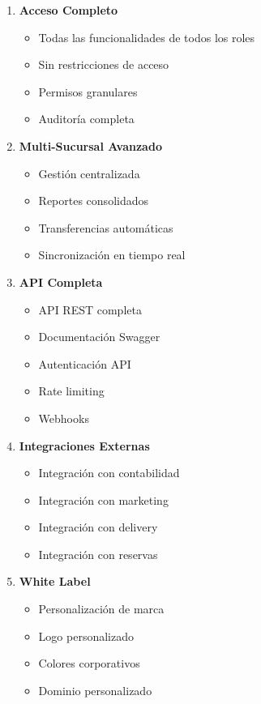 \documentclass[12pt,a4paper]{article}
\begin{document}
\begin{enumerate}
    \item \textbf{Acceso Completo}
    \begin{itemize}
        \item Todas las funcionalidades de todos los roles
        \item Sin restricciones de acceso
        \item Permisos granulares
        \item Auditoría completa
    \end{itemize}
    
    \item \textbf{Multi-Sucursal Avanzado}
    \begin{itemize}
        \item Gestión centralizada
        \item Reportes consolidados
        \item Transferencias automáticas
        \item Sincronización en tiempo real
    \end{itemize}
    
    \item \textbf{API Completa}
    \begin{itemize}
        \item API REST completa
        \item Documentación Swagger
        \item Autenticación API
        \item Rate limiting
        \item Webhooks
    \end{itemize}
    
    \item \textbf{Integraciones Externas}
    \begin{itemize}
        \item Integración con contabilidad
        \item Integración con marketing
        \item Integración con delivery
        \item Integración con reservas
    \end{itemize}
    
    \item \textbf{White Label}
    \begin{itemize}
        \item Personalización de marca
        \item Logo personalizado
        \item Colores corporativos
        \item Dominio personalizado
    \end{itemize}
    

\end{enumerate}
\end{document}
